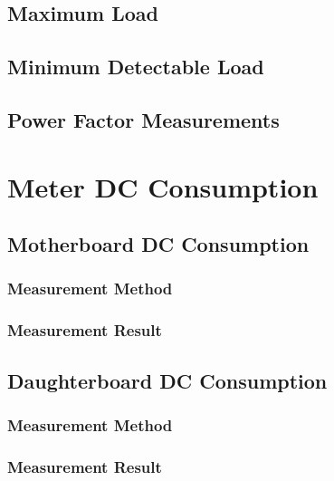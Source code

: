 \documentclass[]{article}
\begin{document}
\subsection{Maximum Load}

\subsection{Minimum Detectable Load}

\subsection{Power Factor Measurements}


\section{Meter DC Consumption}

\subsection{Motherboard DC Consumption}

\subsubsection{Measurement Method}
\subsubsection{Measurement Result}

\subsection{Daughterboard DC Consumption}

\subsubsection{Measurement Method}
\subsubsection{Measurement Result}
\end{document}
